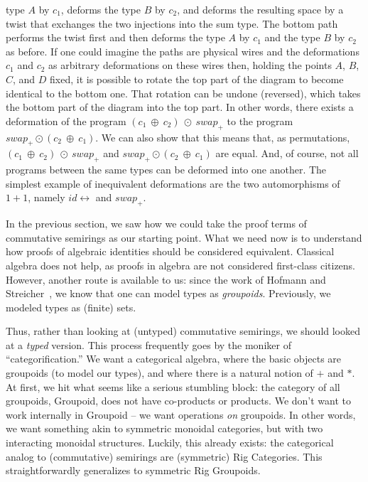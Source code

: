 \documentclass{article}
\newcommand{\swapp}{\mathit{swap}_+}
\newcommand{\idc}{\mathit{id}\!\!\leftrightarrow}
\begin{document}
type $A$ by $c_1$, deforms the type $B$ by $c_2$, and deforms the
resulting space by a twist that exchanges the two injections into the
sum type. The bottom path performs the twist first and then deforms
the type $A$ by $c_1$ and the type $B$ by $c_2$ as before. If one
could imagine the paths are physical wires and the deformations $c_1$
and $c_2$ as arbitrary deformations on these wires then, holding the
points $A$, $B$, $C$, and $D$ fixed, it is possible to rotate the top
part of the diagram to become identical to the bottom one. That
rotation can be undone (reversed), which takes the bottom
part of the diagram into the top part.  In other
words, there exists a deformation of the program
$(c_1~\oplus~c_2)~\odot~\swapp$ to the program
$\swapp \odot (c_2~\oplus~c_1)$. We can also show that this
means that, as permutations, $(c_1~\oplus~c_2)~\odot~\swapp$ and
$\swapp \odot (c_2~\oplus~c_1)$ are equal. And, of course, not
all programs between the same types can be deformed into one
another. The simplest example of inequivalent deformations
are the two automorphisms of $1+1$, namely $\idc$ and $\swapp$.

In the previous section, we saw how we could take the proof
terms of commutative semirings as our starting point. What we need
now is to understand how proofs of algebraic identities should be
considered equivalent. Classical algebra does not help, as proofs
in algebra are not considered first-class citizens. However,
another route is available to us: since the work of 
Hofmann and Streicher~\cite{hofmann96thegroupoid}, we know that
one can model types as \emph{groupoids}.  Previously, we
modeled types as (finite) sets.

Thus, rather than looking at (untyped) commutative semirings,
we should looked at a \emph{typed} version. This process frequently
goes by the moniker of ``categorification.''  We want a categorical
algebra, where the basic objects are groupoids (to model our types),
and where there is a natural notion of $+$ and $*$.  At first,
we hit what seems like a serious stumbling block: the category of
all groupoids, Groupoid, does not have co-products or products.
We don't want to work internally in Groupoid -- we want operations
\emph{on} groupoids. In other words, we want something akin to
symmetric monoidal categories, but with two interacting 
monoidal structures.  Luckily, this already exists: the categorical
analog to (commutative) semirings are (symmetric) Rig Categories.
This straightforwardly generalizes to symmetric Rig Groupoids.
\end{document}
